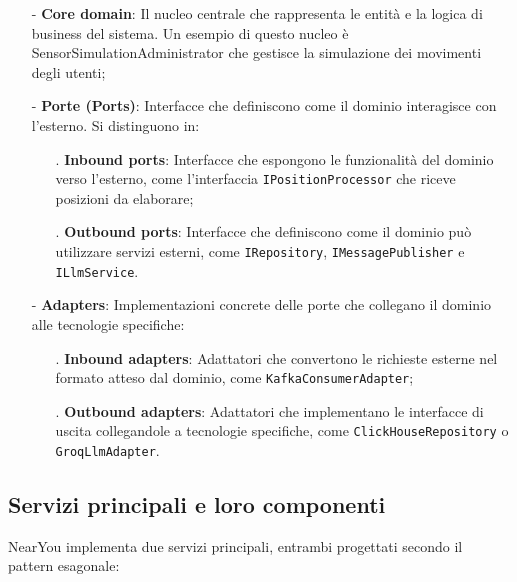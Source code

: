 \documentclass[10pt]{article}
\begin{document}
    \begin{itemize}
        \item[-] \textbf{Core domain}: Il nucleo centrale che rappresenta le entità e la logica di business del sistema. Un esempio di questo nucleo è SensorSimulationAdministrator che gestisce la simulazione dei movimenti degli utenti;
        \item[-] \textbf{Porte (Ports)}: Interfacce che definiscono come il dominio interagisce con l'esterno. Si distinguono in:
        \begin{itemize}
            \item[.] \textbf{Inbound ports}: Interfacce che espongono le funzionalità del dominio verso l'esterno, come l'interfaccia \texttt{IPositionProcessor} che riceve posizioni da elaborare;
            \item[.] \textbf{Outbound ports}: Interfacce che definiscono come il dominio può utilizzare servizi esterni, come \texttt{IRepository}, \texttt{IMessagePublisher} e \texttt{ILlmService}.
        \end{itemize}
        \item[-] \textbf{Adapters}: Implementazioni concrete delle porte che collegano il dominio alle tecnologie specifiche:
        \begin{itemize}
            \item[.] \textbf{Inbound adapters}: Adattatori che convertono le richieste esterne nel formato atteso dal dominio, come \texttt{KafkaConsumerAdapter};
            \item[.] \textbf{Outbound adapters}: Adattatori che implementano le interfacce di uscita collegandole a tecnologie specifiche, come \texttt{ClickHouseRepository} o \texttt{GroqLlmAdapter}.
        \end{itemize}
    \end{itemize}

    \subsection{Servizi principali e loro componenti}

    NearYou implementa due servizi principali, entrambi progettati secondo il pattern esagonale:
\end{document}
